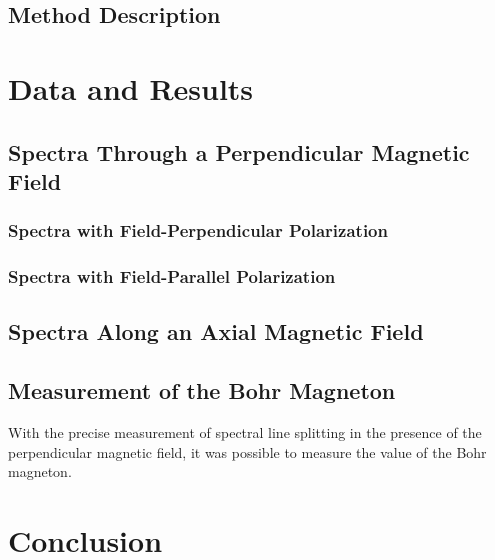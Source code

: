 \documentclass[twocolumn]{article}
\begin{document}
	\subsection{Method Description} \label{subsec:MethodDescription}
	
\section{Data and Results} \label{sec:DataAndResults}
 
	\subsection{Spectra Through a Perpendicular Magnetic Field}
		\subsubsection{Spectra with Field-Perpendicular Polarization}
	
		\subsubsection{Spectra with Field-Parallel Polarization}
	
	\subsection{Spectra Along an Axial Magnetic Field}
	
	\subsection{Measurement of the Bohr Magneton} \label{subsec:BohrMagneton}
		With the precise measurement of spectral line splitting in the presence of the perpendicular magnetic field, it was possible to measure the value of the Bohr magneton.
	

\section{Conclusion} \label{sec:Conclusion}
\end{document}
